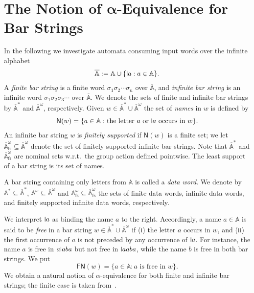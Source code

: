 \documentclass[final,a4paper,UKenglish,thm-restate,autoref,numberwithinsect]{lipics-v2021}
\newcommand{\midmid}{\hspace{0.2ex}{\rule[-0.1ex]{0.6pt}{1.65ex}}\hspace{0.2ex}}
\newcommand{\compr}{:}
\newcommand{\newletter}[1]{{\midmid}#1}
\newcommand{\Names}[1]{\mathsf{N}(#1)}
\newcommand{\free}[1]{\mathsf{FN}(#1)}
\newcommand{\barA}{\overline{\names}}
\numberwithin{equation}{section}
\newcommand{\seq}{\subseteq}
\newcommand{\muBar}{\textsf{Bar-$\mu$TL}}
\newcommand{\pow}{\mathcal{P}}
\newcommand{\fs}{\mathsf{fs}}
\newcommand{\+}[1]{\mathcal{#1}\xspace}
\DeclareMathOperator{\LFP}{\mathsf{LFP}}
\DeclareMathOperator{\GFP}{\mathsf{GFP}}
\newcommand{\names}{\mathbb{A}}
\newcommand{\powfs}{\pow_{\fs}}
\theoremstyle{definition}
\begin{document}


\section{The Notion of $\boldsymbol{\alpha}$-Equivalence for Bar Strings}\label{sec:alpha-equiv}
In the following we investigate automata consuming input words over the infinite alphabet 
\[
  \barA := \names \cup \{\newletter a: a\in \names\}.
\]
A \emph{finite bar string} is a finite word $\sigma_1\sigma_2\cdots \sigma_n$ over $\barA$, and \emph{infinite bar string} is an infinite word $\sigma_1\sigma_2 \sigma_3\cdots$ over $\barA$. We denote the sets of finite and infinite bar strings by  $\barA^*$ and $\barA^\omega$, respectively. Given $w\in \barA^*\cup \barA^\omega$ the set of \emph{names} in $w$ is defined by 
\[ \Names{w} = \{ a\in \names \compr \text{the letter $a$ or $\newletter a$ occurs in $w$} \}. \]
An infinite bar string $w$ is \emph{finitely supported} if $\Names{w}$ is a finite set; we let $\barA^\omega_\fs\seq \barA^\omega$ denote the set of finitely supported infinite bar strings. Note that $\barA^*$ and $\barA^\omega_\fs$ are nominal sets w.r.t.\ the group action defined pointwise. The least support of a bar string is its set of names.

A bar string containing only letters from $\names$ is called a \emph{data word}. We denote by $\names^*\seq \barA^*$, $\names^\omega\seq \barA^\omega$ and $\names^\omega_\fs\seq \barA^\omega_\fs$ the sets of finite data words, infinite data words, and finitely supported infinite data words, respectively. 

We interpret $\newletter a$ as binding the name $a$ to the right. Accordingly, a name $a\in \names$ is said to be \emph{free} in a bar string $w\in \barA^*\cup \barA^\omega$ if (i) the letter $a$ occurs in $w$, and (ii) the first occurrence of $a$ is not preceded by any occurrence of $\newletter a$. For instance, the name $a$ is free in $a\newletter aba$ but not free in $\newletter aaba$, while the name $b$ is free in both bar strings. We put 
\[\free{w} = \{ a\in \names\compr \text{$a$ is free in $w$} \}. \]
We obtain a natural notion of $\alpha$-equivalence for both finite and infinite bar strings; the finite case is taken from~\cite{SchroderEA17}.
\end{document}
